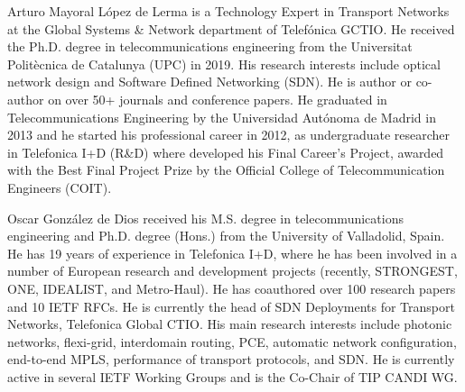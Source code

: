 \documentclass[10pt, conference]{IEEEtran}
\begin{document}
\begin{IEEEbiography}%
{Arturo Mayoral López de Lerma} is a Technology Expert in Transport Networks at the Global Systems \& Network department of Telefónica GCTIO. He received the Ph.D. degree in telecommunications engineering from the Universitat Politècnica de Catalunya (UPC) in 2019. His  research  interests  include  optical network design and Software Defined Networking (SDN). He is author or co-author on over 50+ journals and conference papers. He graduated in Telecommunications Engineering by the Universidad Autónoma de Madrid in 2013 and he started his professional career in 2012, as undergraduate researcher in Telefonica I+D (R\&D) where developed his Final Career’s Project, awarded with the Best Final Project Prize by the Official College of Telecommunication Engineers (COIT).\end{IEEEbiography}

\begin{IEEEbiography}%
{Oscar González de Dios} received his M.S. degree in telecommunications engineering and Ph.D. degree (Hons.) from the University of Valladolid, Spain. He has 19 years of experience in Telefonica I+D, where he has been involved in a number of European research and development projects (recently, STRONGEST, ONE, IDEALIST, and Metro-Haul). He has coauthored over 100 research papers and 10 IETF RFCs. He is currently the head of SDN Deployments for Transport Networks, Telefonica Global CTIO. His main research interests include photonic networks, flexi-grid, interdomain routing, PCE, automatic network configuration, end-to-end MPLS, performance of transport protocols, and SDN. He is currently active in several IETF Working Groups and is the Co-Chair of TIP CANDI WG.\end{IEEEbiography}
\end{document}
